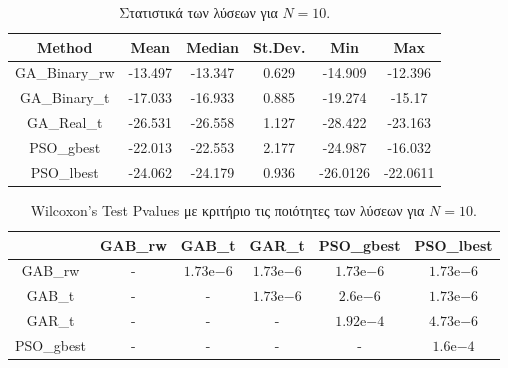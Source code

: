 \documentclass[12pt, a4paper]{article}
\newcommand{\en}{\selectlanguage{english}}
\newcommand{\gr}{\selectlanguage{greek}}
\begin{document}
\begin{table}[H]
	\centering
	\begin{tabular}{| c | c | c | c | c | c |}
		
		\hline
		\en Method & \en Mean & \en Median & \en St.Dev. & \en Min & \en Max \\
		
		\hline
		\en GA\_Binary\_rw & -13.497 & -13.347 & 0.629 & -14.909 & -12.396 \\ 
		
		\hline
		\en GA\_Binary\_t & -17.033 & -16.933 & 0.885 & -19.274 & -15.17 \\ 
		
		\hline
		\en GA\_Real\_t & -26.531 & -26.558 & 1.127 & -28.422 & -23.163 \\ 
		
		\hline
		\en PSO\_gbest & -22.013 & -22.553 & 2.177 & -24.987 & -16.032\\ 
		
		\hline
		\en PSO\_lbest & -24.062 & -24.179 & 0.936 & -26.0126 & -22.0611\\ 
		
		\hline
		
	\end{tabular}
	\caption{Στατιστικά των λύσεων για $N = 10$.}
	\label{tab:sol_qual_N10}
\end{table}

\begin{table}[H]
	\centering
	\begin{tabular}{| c | c | c | c | c | c |}
		
		\hline
		\en  & \en GAB\_rw & \en GAB\_t & \en GAR\_t & \en PSO\_gbest & \en PSO\_lbest\\
		
		\hline
		\en GAB\_rw & - & $1.73\mathrm{e}{-6}$ & $1.73\mathrm{e}{-6}$ & $1.73\mathrm{e}{-6}$ & $1.73\mathrm{e}{-6}$ \\ 
		
		\hline
		\en GAB\_t & - & - & $1.73\mathrm{e}{-6}$ & $2.6\mathrm{e}{-6}$ & $1.73\mathrm{e}{-6}$ \\ 
		
		\hline
		\en GAR\_t & - & - & - & $1.92\mathrm{e}{-4}$ & $4.73\mathrm{e}{-6}$ \\ 
		
		\hline
		\en PSO\_gbest & - & - & - & - & $1.6\mathrm{e}{-4}$\\ 
		
		\hline
		
	\end{tabular}
	\caption{\en Wilcoxon's Test Pvalues \gr με κριτήριο τις ποιότητες των λύσεων για $N = 10$.}
	\label{tab:sol_qual_pval_N10}
\end{table}
\end{document}
